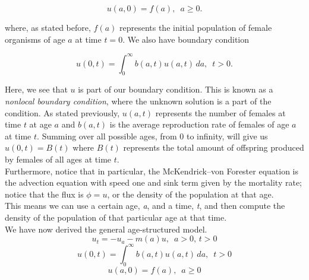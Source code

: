 \[u(a, 0)=f(a), \, \, \, a \geq 0.\]

where, as stated before, $f(a)$ represents the initial population of female organisms of age $a$ at time $t=0.$ We also have boundary condition 

\[ u(0,t) = \int_0^{\infty}b(a,t)u(a, t) \, da, \, \, \, t>0.\]

Here, we see that $u$ is part of our boundary condition. This is known as a \emph{nonlocal boundary condition}, where the unknown solution is a part of the condition. As stated previously, $u(a, t) $ represents the number of females at time $t$ at age $a$ and $b(a, t)$ is the average reproduction rate of females of age $a$ at time $t.$ Summing over all possible ages, from $0$ to infinity, will give us $u(0,t) = B(t)$ where $B(t)$ represents the total amount of offspring produced by females of all ages at time $t$. \\

Furthermore, notice that in particular, the McKendrick–von Forester equation is the advection equation with speed one and sink term given by the mortality rate; notice that the flux is $\phi = u$, or the density of the population at that age. \\

This means we can use a certain age, \textit{a}, and a time, \textit{t}, and then compute the density of the population of that particular age at that time. \\

We have now derived the general age-structured model.
\[ u_t = -u_a-m(a)u, \, \, \, a>0, \, t>0\]
\[ u(0,t) = \int_0^{\infty}b(a,t)u(a, t) \, da, \, \, \, t>0\]
\[ u(a, 0)=f(a), \, \, \, a \geq 0\]
\\

